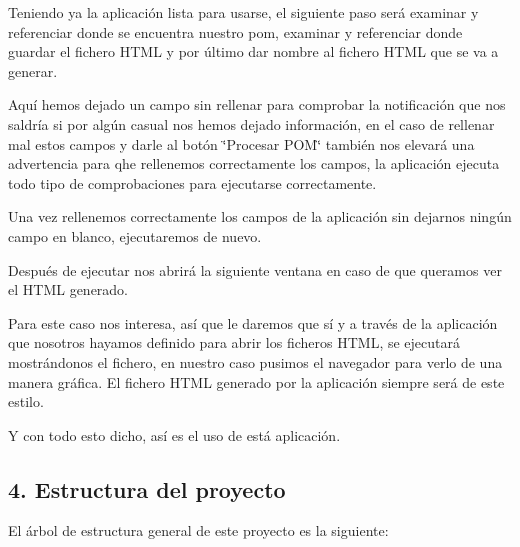 \begin{DoxyEnumerate}
\item Teniendo ya la aplicación lista para usarse, el siguiente paso será examinar y referenciar donde se encuentra nuestro pom, examinar y referenciar donde guardar el fichero H\+T\+ML y por último dar nombre al fichero H\+T\+ML que se va a generar.
\end{DoxyEnumerate}





Aquí hemos dejado un campo sin rellenar para comprobar la notificación que nos saldría si por algún casual nos hemos dejado información, en el caso de rellenar mal estos campos y darle al botón \char`\"{}\+Procesar P\+O\+M\char`\"{} también nos elevará una advertencia para qhe rellenemos correctamente los campos, la aplicación ejecuta todo tipo de comprobaciones para ejecutarse correctamente.


\begin{DoxyEnumerate}
\item Una vez rellenemos correctamente los campos de la aplicación sin dejarnos ningún campo en blanco, ejecutaremos de nuevo.
\end{DoxyEnumerate}



Después de ejecutar nos abrirá la siguiente ventana en caso de que queramos ver el H\+T\+ML generado.



Para este caso nos interesa, así que le daremos que sí y a través de la aplicación que nosotros hayamos definido para abrir los ficheros H\+T\+ML, se ejecutará mostrándonos el fichero, en nuestro caso pusimos el navegador para verlo de una manera gráfica. El fichero H\+T\+ML generado por la aplicación siempre será de este estilo.



Y con todo esto dicho, así es el uso de está aplicación.

\subsection*{4. Estructura del proyecto}

El árbol de estructura general de este proyecto es la siguiente\+:



